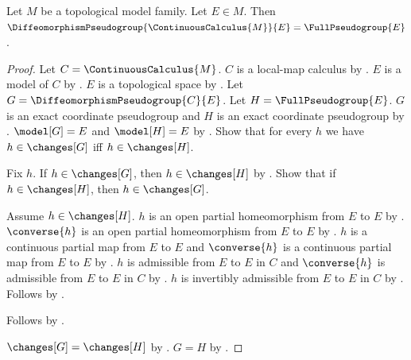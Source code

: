 \begin{theorem}\label{continuous_calculus_pseudogroup}
    Let $M$ be a topological model family.
    Let $E\in M$.
    Then $\DiffeomorphismPseudogroup{\ContinuousCalculus{M}}{E}
        =\FullPseudogroup{E}$.
\end{theorem}
\begin{proof}
    Let $C=\ContinuousCalculus{M}$.
    $C$ is a local-map calculus by .
    $E$ is a model of $C$ by .
    $E$ is a topological space by .
    Let $G=\DiffeomorphismPseudogroup{C}{E}$.
    Let $H=\FullPseudogroup{E}$.
    $G$ is an exact coordinate pseudogroup and $H$ is an exact coordinate pseudogroup by
        .
    $\model[G]=E$ and $\model[H]=E$ by
        .
    Show that for every $h$ we have $h\in\changes[G]$ iff $h\in\changes[H]$.
    \begin{subproof}
        Fix $h$.
        If $h\in\changes[G]$, then $h\in\changes[H]$ by
            .
        Show that if $h\in\changes[H]$, then $h\in\changes[G]$.
        \begin{subproof}
            Assume $h\in\changes[H]$.
            $h$ is an open partial homeomorphism from $E$ to $E$ by
                .
            $\converse{h}$ is an open partial homeomorphism from $E$ to $E$ by
                .
            $h$ is a continuous partial map from $E$ to $E$ and
                $\converse{h}$ is a continuous partial map from $E$ to $E$ by
                .
            $h$ is admissible from $E$ to $E$ in $C$ and
                $\converse{h}$ is admissible from $E$ to $E$ in $C$ by
                .
            $h$ is invertibly admissible from $E$ to $E$ in $C$ by
                .
            Follows by .
        \end{subproof}
        Follows by \auto.
    \end{subproof}
    $\changes[G]=\changes[H]$ by .
    $G=H$ by .
\end{proof}


